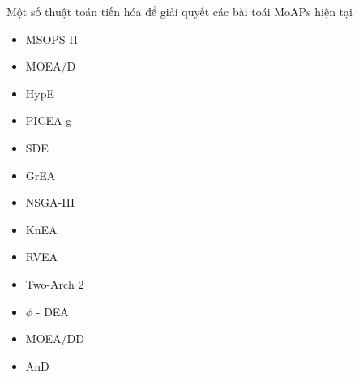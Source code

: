 \documentclass{beamer}
\begin{document}
    \begin{frame}{Một số thuật toán tiến hóa để giải quyết các bài toái MoAPs hiện tại}
        \begin{multicols}{2}
        \begin{itemize}
            \item MSOPS-II
            \item MOEA/D
            \item HypE
            \item PICEA-g
            \item SDE
            \item GrEA
            \item NSGA-III
            \item KnEA
            \item RVEA
            \item Two-Arch 2
            \item $ \phi $ - DEA
            \item MOEA/DD
            \item AnD
        \end{itemize}
        \end{multicols}
    \end{frame}
\end{document}
